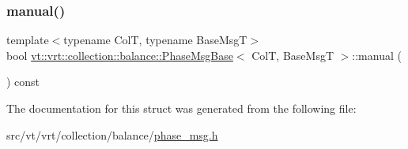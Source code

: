 \mbox{\label{structvt_1_1vrt_1_1collection_1_1balance_1_1_phase_msg_base_a972351dacbddafb7d6a5d73d57eda63a}} 
\subsubsection{\texorpdfstring{manual()}{manual()}}
{\footnotesize\ttfamily template$<$typename ColT, typename Base\+MsgT$>$ \\
bool \hyperlink{structvt_1_1vrt_1_1collection_1_1balance_1_1_phase_msg_base}{vt\+::vrt\+::collection\+::balance\+::\+Phase\+Msg\+Base}$<$ ColT, Base\+MsgT $>$\+::manual (\begin{DoxyParamCaption}{ }\end{DoxyParamCaption}) const\hspace{0.3cm}{\ttfamily [inline]}}



The documentation for this struct was generated from the following file\+:\begin{DoxyCompactItemize}
\item 
src/vt/vrt/collection/balance/\hyperlink{phase__msg_8h}{phase\+\_\+msg.\+h}\end{DoxyCompactItemize}
